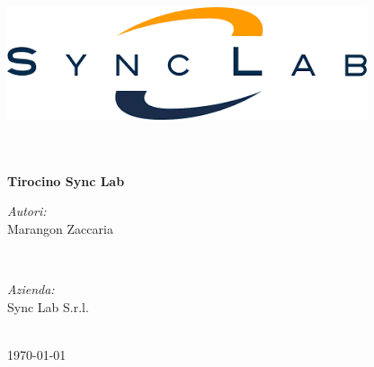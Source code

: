    \begin{titlepage}
        \begin{center}
            \includegraphics[width=\textwidth]{img/logo_azienda.png}

            \vspace{2cm}
            \hrulefill\\[0.2cm]
            \textbf{\titoloDocumento}\\[0.2cm]
            \textbf{Tirocino Sync Lab}\\
            \hrulefill

            \vspace{8cm}
            \begin{minipage}{0.4\textwidth}
                \begin{flushleft} \large
                    \emph{Autori:}\\
                    {Marangon Zaccaria}
                \end{flushleft}
            \end{minipage}
            ~
            \begin{minipage}
                {0.4\textwidth}
                \begin{flushright} \large
                    \emph{Azienda:} \\
                    {Sync Lab S.r.l.}
                \end{flushright}
            \end{minipage}\\[1.5cm]

            {\large \today}
        
        \end{center}
    \end{titlepage}
\restoregeometry